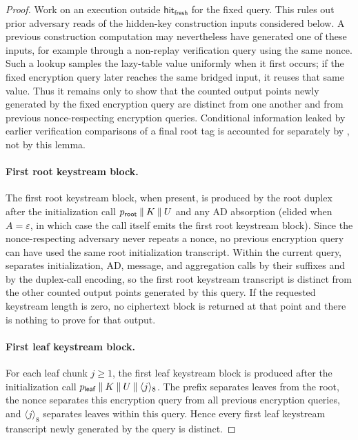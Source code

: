 \begin{proof}
Work on an execution outside $\mathsf{hit}_{\mathsf{fresh}}$ for the
fixed query. This rules out prior adversary reads of the hidden-key
construction inputs considered below. A previous construction computation
may nevertheless have generated one of these inputs, for example through
a non-replay verification query using the same nonce. Such a lookup
samples the lazy-table value uniformly when it first occurs; if the fixed
encryption query later reaches the same bridged input, it reuses that
same value. Thus it remains only to show that the counted output points
newly generated by the fixed encryption query are distinct from one
another and from previous nonce-respecting encryption queries. Conditional
information leaked by earlier verification comparisons of a final root
tag is accounted for separately by , not
by this lemma.

\paragraph{First root keystream block.}
The first root keystream block, when present, is produced by the root
duplex after the initialization call $p_{\mathsf{root}} \mathbin{\|} K
\mathbin{\|} U$ and any AD absorption (elided when $A = \varepsilon$, in
which case the \siginit call itself emits the first root keystream
block). Since the nonce-respecting adversary never repeats
a nonce, no previous encryption query can have used the same root
initialization transcript. Within the current query,
 separates initialization, AD, message, and
aggregation calls by their suffixes and by the duplex-call encoding,
so the first root keystream transcript is distinct from the other
counted output points generated by this query. If the requested
keystream length is zero, no ciphertext block is returned at that point
and there is nothing to prove for that output.

\paragraph{First leaf keystream block.}
For each leaf chunk $j \geq 1$, the first leaf keystream block is
produced after the initialization call $p_{\mathsf{leaf}} \mathbin{\|}
K \mathbin{\|} U \mathbin{\|} \langle j \rangle_8$. The prefix separates leaves
from the root, the nonce separates this encryption query from all
previous encryption queries, and $\langle j \rangle_8$ separates
leaves within this query. Hence every first leaf keystream transcript
newly generated by the query is distinct.


\end{proof}
